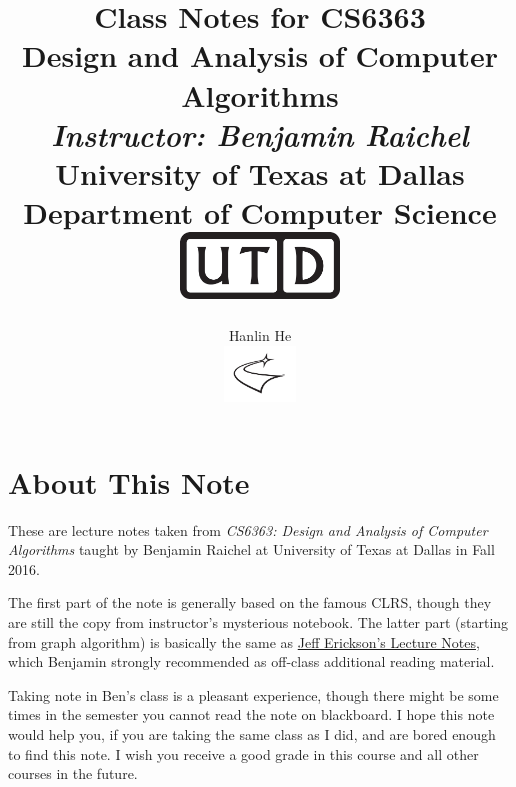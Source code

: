 \documentclass[12pt,letterpaper,titlepage]{article}
\title{
    \vspace{1in}
    \textmd{\textbf{Class Notes for CS6363}}\\
    \textbf{\Large{Design and Analysis of Computer Algorithms}}\\
    \large\vspace{0.1in}\textit{Instructor: Benjamin Raichel}\\
    \vspace{0.1in}\normalsize{University of Texas at Dallas}\\
    Department of Computer Science\\
    \vspace{0.1in}\includegraphics[height=2.4em]{fig/UTD_logo_BW}\\
    \vspace{2in}
}
\author{Hanlin He\\\vspace{0.1in}\includegraphics[height=4em]{fig/comets_logo_black.pdf}}
\date{}
\begin{document}
\maketitle

\pagestyle{empty}
\section*{About This Note}
These are lecture notes taken from \emph{CS6363: Design and Analysis of Computer Algorithms} taught by Benjamin Raichel
at University of Texas at Dallas in Fall 2016.

The first part of the note is generally based on the famous CLRS, though they are still the copy from instructor's mysterious notebook.
The latter part (starting from graph algorithm) is basically the same as
\href{http://jeffe.cs.illinois.edu/teaching/algorithms/}{Jeff Erickson's Lecture Notes},
which Benjamin strongly recommended as off-class additional reading material.

Taking note in Ben's class is a pleasant experience, though there might be some times
in the semester you cannot read the note on blackboard.
I hope this note would help you, if you are taking the same class as I did,
and are bored enough to find this note.
I wish you receive a good grade in this course and all other courses in the future.


\pagebreak

\pagestyle{plain}
\tableofcontents
\pagebreak
\listoffigures
\listoftables
\pagebreak
\listofalgorithms
\pagebreak




\pagebreak



\pagebreak



\pagebreak



\pagebreak



\pagebreak



\pagebreak



\pagebreak



\pagebreak


\end{document}
